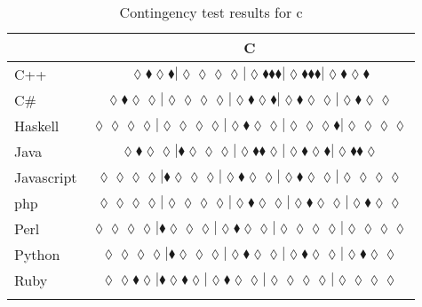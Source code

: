 
\begin{table*}
\centering
\begin{tabular}{l c}
& C \\
\hline

C++ & $\scriptscriptstyle\lozenge\blacklozenge\lozenge\blacklozenge|\lozenge\lozenge\lozenge\lozenge|\lozenge\blacklozenge\blacklozenge\blacklozenge|\lozenge\blacklozenge\blacklozenge\blacklozenge|\lozenge\blacklozenge\lozenge\blacklozenge$ \\
C\# & $\scriptscriptstyle\lozenge\blacklozenge\lozenge\lozenge|\lozenge\lozenge\lozenge\lozenge|\lozenge\blacklozenge\lozenge\blacklozenge|\lozenge\blacklozenge\lozenge\lozenge|\lozenge\blacklozenge\lozenge\lozenge$ \\
Haskell & $\scriptscriptstyle\lozenge\lozenge\lozenge\lozenge|\lozenge\lozenge\lozenge\lozenge|\lozenge\blacklozenge\lozenge\lozenge|\lozenge\lozenge\lozenge\blacklozenge|\lozenge\lozenge\lozenge\lozenge$ \\
Java & $\scriptscriptstyle\lozenge\blacklozenge\lozenge\lozenge|\blacklozenge\lozenge\lozenge\lozenge|\lozenge\blacklozenge\blacklozenge\lozenge|\lozenge\blacklozenge\lozenge\blacklozenge|\lozenge\blacklozenge\blacklozenge\lozenge$ \\
Javascript & $\scriptscriptstyle\lozenge\lozenge\lozenge\lozenge|\blacklozenge\lozenge\lozenge\lozenge|\lozenge\blacklozenge\lozenge\lozenge|\lozenge\blacklozenge\lozenge\lozenge|\lozenge\lozenge\lozenge\lozenge$ \\
{\sc php} & $\scriptscriptstyle\lozenge\lozenge\lozenge\lozenge|\lozenge\lozenge\lozenge\lozenge|\lozenge\blacklozenge\lozenge\lozenge|\lozenge\blacklozenge\lozenge\lozenge|\lozenge\blacklozenge\lozenge\lozenge$ \\
Perl & $\scriptscriptstyle\lozenge\lozenge\lozenge\lozenge|\blacklozenge\lozenge\lozenge\lozenge|\lozenge\blacklozenge\lozenge\lozenge|\lozenge\lozenge\lozenge\lozenge|\lozenge\lozenge\lozenge\lozenge$ \\
Python & $\scriptscriptstyle\lozenge\lozenge\lozenge\lozenge|\blacklozenge\lozenge\lozenge\lozenge|\lozenge\blacklozenge\lozenge\lozenge|\lozenge\blacklozenge\lozenge\lozenge|\lozenge\blacklozenge\lozenge\lozenge$ \\
Ruby & $\scriptscriptstyle\lozenge\lozenge\blacklozenge\lozenge|\blacklozenge\lozenge\blacklozenge\lozenge|\lozenge\blacklozenge\lozenge\lozenge|\lozenge\lozenge\lozenge\lozenge|\lozenge\lozenge\lozenge\lozenge$ \\

\hline
& \\
\end{tabular}
\caption{Contingency test results for c}
\label{tbl:contingency-test-results-c}
\end{table*}


